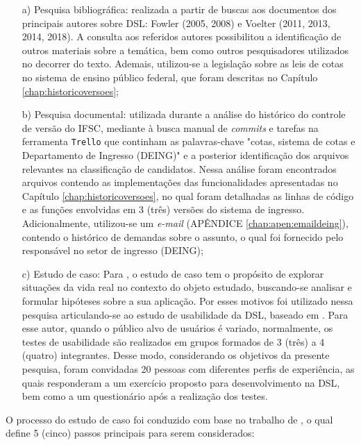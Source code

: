 \begin{enumerate}
    \item[a)] Pesquisa bibliográfica: realizada a partir de buscas aos documentos dos principais autores sobre \gls{DSL}: Fowler (2005, 2008) e Voelter (2011, 2013, 2014, 2018). A consulta aos referidos autores possibilitou a identificação de outros materiais sobre a temática, bem como outros pesquisadores utilizados no decorrer do texto. Ademais, utilizou-se a legislação sobre as leis de cotas no sistema de ensino público federal, que foram descritas no Capítulo \ref{chap:historicoversoes};

    
    \item[b)] Pesquisa documental: utilizada durante a análise do histórico do controle de versão do \gls{IFSC}, mediante à busca manual de \textit{commits} e tarefas na ferramenta \texttt{Trello} que continham as palavras-chave "cotas, sistema de cotas e Departamento de Ingresso (DEING)" e a posterior identificação dos arquivos relevantes na classificação de candidatos. Nessa análise foram encontrados arquivos contendo as implementações das funcionalidades apresentadas no Capítulo \ref{chap:historicoversoes}, no qual foram detalhadas as linhas de código e as funções envolvidas em 3 (três) versões do sistema de ingresso. Adicionalmente, utilizou-se um \textit{e-mail} (APÊNDICE \ref{chap:apen:emaildeing}), contendo o histórico de demandas sobre o assunto, o qual foi fornecido pelo responsável no setor de ingresso (DEING);
    
    \item[c)] Estudo de caso: Para , o estudo de caso tem o propósito de explorar situações da vida real no contexto do objeto estudado, buscando-se analisar e formular hipóteses sobre a sua aplicação. Por esses motivos foi utilizado nessa pesquisa articulando-se ao estudo de usabilidade da \gls{DSL}, baseado em . Para esse autor, quando o público alvo de usuários é variado, normalmente, os testes de usabilidade são realizados em grupos formados de 3 (três) a 4 (quatro) integrantes. Desse modo, considerando os objetivos da presente pesquisa, foram convidadas 20 pessoas com diferentes perfis de experiência, as quais responderam a um exercício proposto para desenvolvimento na \gls{DSL}, bem como a um questionário após a realização dos testes. 
    
\end{enumerate}

    O processo do estudo de caso foi conduzido com base no trabalho de , o qual define 5 (cinco) passos principais para serem considerados:
    
